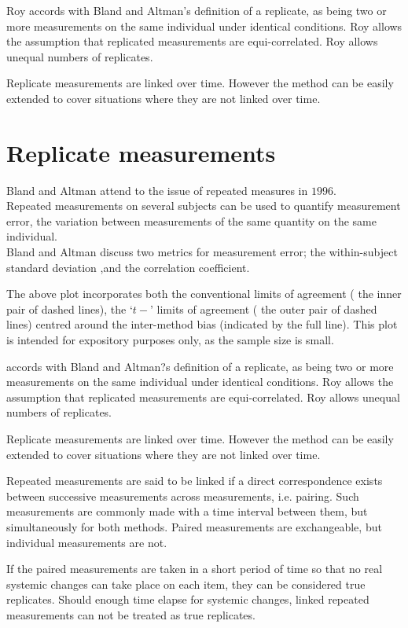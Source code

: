 \documentclass[12pt, a4paper]{report}
\theoremstyle{plain}
\theoremstyle{definition}
\theoremstyle{remark}
\begin{document}
	Roy accords with Bland and Altman's definition of a replicate, as being two or more measurements on the same individual under identical conditions. Roy allows the assumption that replicated measurements are equi-correlated. Roy allows unequal numbers of replicates.
	
	Replicate measurements are linked over time. However the method can be easily extended to cover situations where they are not linked over time.
	\section{Replicate measurements}
	Bland and Altman attend to the issue of repeated measures in
	$1996$.
	\\
	Repeated measurements on several subjects can be used to quantify
	measurement error, the variation between measurements of the same
	quantity on the same individual.
	\\
	Bland and Altman discuss two metrics for measurement error; the
	within-subject standard deviation ,and the correlation
	coefficient.
	
	The above plot incorporates both the conventional limits of
	agreement ( the inner pair of dashed lines), the `$t-$' limits of
	agreement ( the outer pair of dashed lines) centred around the
	inter-method bias (indicated by the full line). This plot is
	intended for expository purposes only, as the sample size is
	small.
	
	\citet{ARoy2009} accords with Bland and Altman?s definition of a replicate, as being two or more measurements on the same individual under identical conditions.
	Roy allows the assumption that replicated measurements are equi-correlated.
	Roy allows unequal numbers of replicates.
	
	
	Replicate measurements are linked over time. However the method can be easily extended to cover situations where they are not linked over time.
	
	Repeated measurements are said to be linked if a direct correspondence exists between successive measurements across measurements, i.e. pairing. Such measurements are commonly made with a time interval between them, but simultaneously for both methods. Paired measurements are exchangeable, but individual measurements are not.
	
	If the paired measurements are taken
	in a short period of time so that no real systemic changes can take place on each item, they can be considered true replicates.
	Should enough time elapse for systemic changes, linked repeated measurements can not be treated as true replicates.
	
\end{document}
